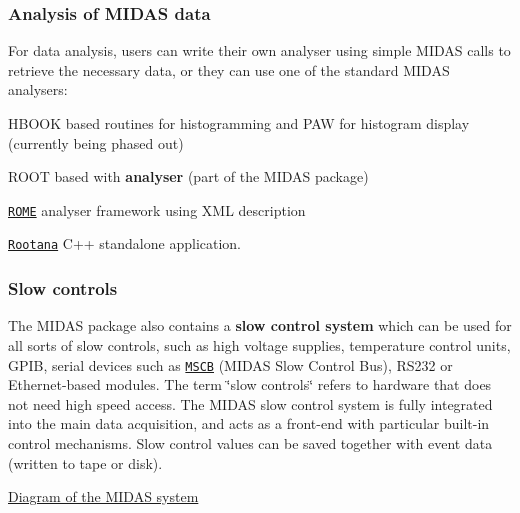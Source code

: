 \label{Intro_idx_data_analysis}
\hypertarget{Intro_idx_data_analysis}{}
 \hypertarget{Intro_I_Analysis}{}\subsubsection{Analysis of MIDAS data}\label{Intro_I_Analysis}
For data analysis, users can write their own analyser using simple MIDAS calls to retrieve the necessary data, or they can use one of the standard MIDAS analysers:
\begin{DoxyItemize}
\item HBOOK based routines for histogramming and PAW for histogram display (currently being phased out)
\item ROOT based with {\bfseries analyser} (part of the MIDAS package)
\item \href{http://midas.psi.ch/rome}{\tt ROME} analyser framework using XML description
\item \href{http://ladd00.triumf.ca/%7Eolchansk/rootana/}{\tt Rootana} C++ standalone application.
\end{DoxyItemize}\hypertarget{Intro_I_slow_controls}{}\subsubsection{Slow controls}\label{Intro_I_slow_controls}
The MIDAS package also contains a {\bfseries slow control system} which can be used for all sorts of slow controls, such as high voltage supplies, temperature control units, GPIB, serial devices such as \href{http://midas.psi.ch/mscb}{\tt MSCB} (MIDAS Slow Control Bus), RS232 or Ethernet-\/based modules. The term \char`\"{}slow controls\char`\"{} refers to hardware that does not need high speed access. The MIDAS slow control system is fully integrated into the main data acquisition, and acts as a front-\/end with particular built-\/in control mechanisms. Slow control values can be saved together with event data (written to tape or disk). \par



\begin{DoxyItemize}
\item \hyperlink{I_Midas_system_picture}{Diagram of the MIDAS system}
\end{DoxyItemize}

\par
 

\par


